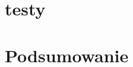 \documentclass[thesis=inz,faculty=ee]{EE-dyplom}
\begin{document}
    \chapter{testy}
    
    \chapter{Podsumowanie}


    \bibliografia
    

    
\end{document}
